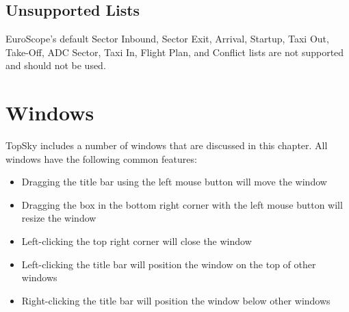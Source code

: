 \documentclass[a4paper,oneside,11pt]{memoir}
\begin{document}
%
%
%
\subsection{Unsupported Lists}
\label{list:unsup}

EuroScope's default Sector Inbound, Sector Exit, Arrival, Startup, Taxi Out, Take-Off, ADC Sector, Taxi In, Flight Plan, and Conflict lists are not supported and should not be used.

\section{Windows}
TopSky includes a number of windows that are discussed in this chapter. All windows have the following common features:

\bigskip

\begin{itemize}
    \item Dragging the title bar using the left mouse button will move the window
    \item Dragging the box in the bottom right corner with the left mouse button will resize the window
    \item Left-clicking the top right corner will close the window
    \item Left-clicking the title bar will position the window on the top of other windows
    \item Right-clicking the title bar will position the window below other windows
\end{itemize}
\end{document}

